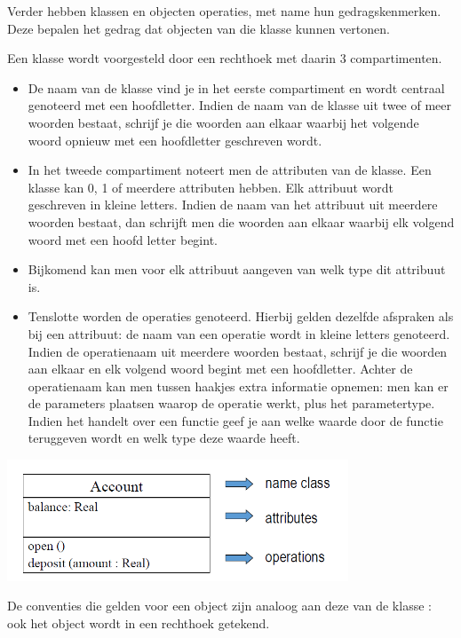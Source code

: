 Verder hebben klassen en objecten operaties, met name hun gedragskenmerken. Deze bepalen het gedrag dat objecten van die klasse kunnen vertonen.

Een klasse wordt voorgesteld door een rechthoek met daarin 3 compartimenten.

\begin{itemize}
    \item De naam van de klasse vind je in het eerste compartiment en wordt centraal genoteerd met een hoofdletter. Indien de naam van de klasse uit twee of meer woorden bestaat, schrijf je die woorden aan elkaar waarbij het volgende woord opnieuw met een hoofdletter geschreven wordt.
    \item In het tweede compartiment noteert men de attributen van de klasse. Een klasse kan 0, 1 of meerdere attributen hebben. Elk attribuut wordt geschreven in kleine letters. Indien de naam van het attribuut uit meerdere woorden bestaat, dan schrijft men die woorden aan elkaar waarbij elk volgend woord met een hoofd letter begint.
    \item Bijkomend kan men voor elk attribuut aangeven van welk type dit attribuut is.
    \item Tenslotte worden de operaties genoteerd. Hierbij gelden dezelfde afspraken als bij een attribuut: de naam van een operatie wordt in kleine letters genoteerd. Indien de operatienaam uit meerdere woorden bestaat, schrijf je die woorden aan elkaar en elk volgend woord begint met een hoofdletter. Achter de operatienaam kan men tussen haakjes extra informatie opnemen: men kan er de parameters plaatsen waarop de operatie werkt, plus het parametertype. Indien het handelt over een functie geef je aan welke waarde door de functie teruggeven wordt en welk type deze waarde heeft.
\end{itemize}


\begin{center}
\includegraphics[width=4in]{img/klas1}%
\end{center}

De conventies die gelden voor een object zijn analoog aan deze van de klasse : ook het object wordt in een rechthoek getekend.

